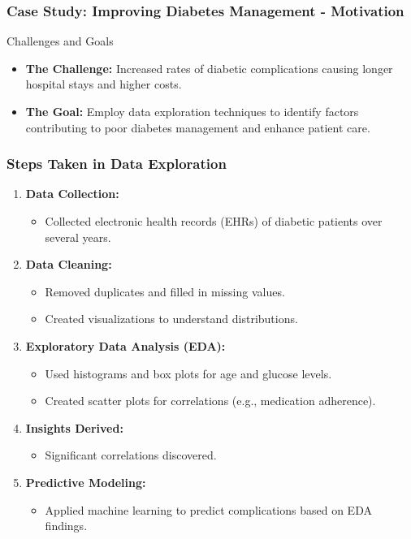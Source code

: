 \documentclass[aspectratio=169]{beamer}
\begin{document}
\begin{frame}[fragile]
    \frametitle{Case Study: Improving Diabetes Management - Motivation}
    \begin{block}{Challenges and Goals}
        \begin{itemize}
            \item \textbf{The Challenge:} Increased rates of diabetic complications causing longer hospital stays and higher costs.
            \item \textbf{The Goal:} Employ data exploration techniques to identify factors contributing to poor diabetes management and enhance patient care.
        \end{itemize}
    \end{block}
\end{frame}

\begin{frame}[fragile]
    \frametitle{Steps Taken in Data Exploration}
    \begin{enumerate}
        \item \textbf{Data Collection:}
            \begin{itemize}
                \item Collected electronic health records (EHRs) of diabetic patients over several years.
            \end{itemize}
        \item \textbf{Data Cleaning:}
            \begin{itemize}
                \item Removed duplicates and filled in missing values.
                \item Created visualizations to understand distributions.
            \end{itemize}
        \item \textbf{Exploratory Data Analysis (EDA):}
            \begin{itemize}
                \item Used histograms and box plots for age and glucose levels.
                \item Created scatter plots for correlations (e.g., medication adherence).
            \end{itemize}
        \item \textbf{Insights Derived:}
            \begin{itemize}
                \item Significant correlations discovered.
            \end{itemize}
        \item \textbf{Predictive Modeling:}
            \begin{itemize}
                \item Applied machine learning to predict complications based on EDA findings.
            \end{itemize}
    \end{enumerate}
\end{frame}
\end{document}
